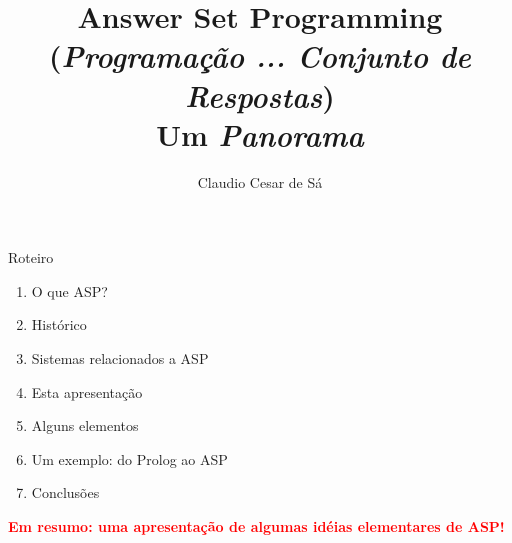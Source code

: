 \documentclass{beamer}
\title[Inteligência Artificial -- Otimização Combinatória] %
{Answer Set Programming \\ (\textit{Programação ... Conjunto de Respostas})\\ Um \emph{Panorama}}
\author[Claudio Cesar de Sá] %
{Claudio Cesar de Sá\inst{1}}
\institute[UDESC]{Pesquisador Independente}
\date[\today] %
\begin{document}
\begin{frame}
  \titlepage
\end{frame}








\begin{frame}

\begin{block}{Roteiro}

\begin{enumerate}

  \item  O que ASP?
  \item  Histórico
  \item  Sistemas relacionados a ASP
  \item  Esta apresentação
  \item  Alguns elementos
  \item  Um exemplo: do Prolog ao ASP
  \item  Conclusões

  \end{enumerate}

\end{block}

\pause
\textbf{\textcolor{red}{Em resumo: uma apresentação de algumas idéias elementares de ASP!}}


\end{frame}
\end{document}
